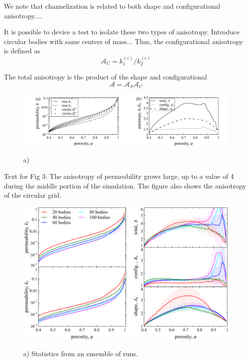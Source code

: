 \documentclass[3p]{elsarticle}
\newcommand{\anis}{\mathcal{A}}
\begin{document}
We note that channelization is related to both shape and configurational anisotropy....

It is possible to device a test to isolate these two types of anisotropy.
Introduce circular bodies with same centers of mass...
Thus, the configurational anisotropy is defined as
\begin{equation}
\anis_C = k_1^{(c)} / k_2^{(c)}
\end{equation}

The total anisotropy is the product of the shape and configurational
\begin{equation}
\anis = \anis_S \anis_C
\end{equation}


\begin{figure}%
\centering \label{fig3}
\includegraphics[width = 0.99 \textwidth]{./figs/fig3.pdf}
\caption{
a)
}
\end{figure}


Text for Fig 3: 
The anisotropy of permeability grows large, up to a value of 4 during the middle portion of the simulation. The figure also shows the anisotropy of the circular grid.

\begin{figure}%
\centering \label{fig4}
\includegraphics[width = 0.99 \textwidth]{./figs/fig4.pdf}
\caption{
a) Statistics from an ensemble of runs.
}
\end{figure}



\end{document}
